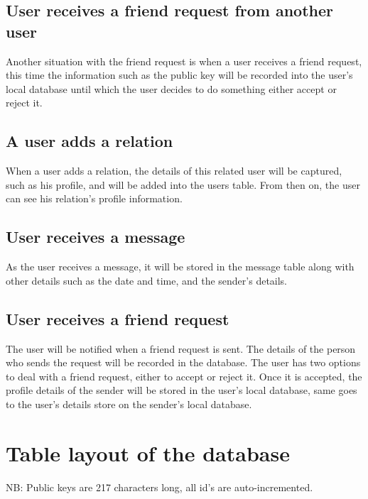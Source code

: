 \subsection{User receives a friend request from another user}
Another situation with the friend request is when a user receives a friend 
request, this time the information such as the public key will be recorded 
into the user's local database until which the user decides to do something 
either accept or reject it.

\subsection{A user adds a relation}
When a user adds a relation, the details of this related user will be captured, 
such as his profile, and will be added into the users table. From then on, the 
user can see his relation's profile information. 

\subsection{User receives a message} 
As the user receives a message, it will be stored in the message table along 
with other details such as the date and time, and the sender's details.

\subsection{User receives a friend request}
The user will be notified when a friend request is sent. The details of the 
person who sends the request will be recorded in the database. The user has 
two options to deal with a friend request, either to accept or reject it. Once 
it is accepted, the profile details of the sender will be stored in the user's 
local database, same goes to the user's details store on the sender's local 
database.

\clearpage

\section{Table layout of the database}
NB: Public keys are 217 characters long, all id's are auto-incremented.


